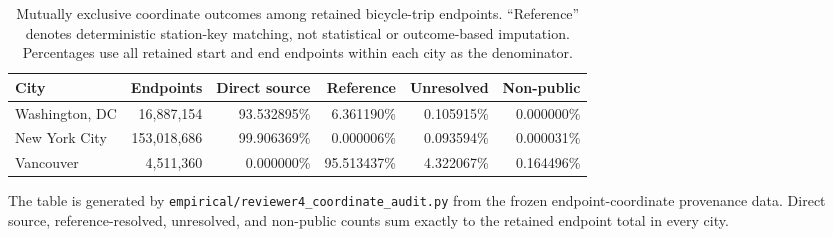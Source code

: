 \begin{table}[!htbp]
\caption{Mutually exclusive coordinate outcomes among retained bicycle-trip
endpoints. ``Reference'' denotes deterministic station-key matching, not
statistical or outcome-based imputation. Percentages use all retained start
and end endpoints within each city as the denominator.}
\label{tab:coordinate_provenance}
\centering
\small
\begin{tabular*}{\textwidth}{@{\extracolsep{\fill}}lrrrrr@{}}
\toprule
\textbf{City} & \textbf{Endpoints} & \textbf{Direct source} &
\textbf{Reference} & \textbf{Unresolved} & \textbf{Non-public}\\
\midrule
Washington, DC & 16,887,154 & 93.532895\% & 6.361190\% & 0.105915\% & 0.000000\%\\
New York City & 153,018,686 & 99.906369\% & 0.000006\% & 0.093594\% & 0.000031\%\\
Vancouver & 4,511,360 & 0.000000\% & 95.513437\% & 4.322067\% & 0.164496\%\\
\bottomrule
\end{tabular*}
\end{table}

The table is generated by
\texttt{empirical/reviewer4\_coordinate\_audit.py} from the frozen
endpoint-coordinate provenance data. Direct source, reference-resolved, unresolved, and
non-public counts sum exactly to the retained endpoint total in every city.



